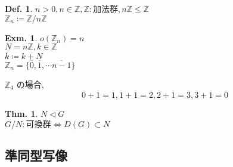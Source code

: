 \documentclass[uplatex,dvipdfmx,9pt]{beamer}
\newcommand{\nsubgroup}{\vartriangleleft} %
\newcounter{textThmCount}
\newcounter{textExmCount}
\theoremstyle{definition} %
\newtheorem{defn}{Def.}[subsection] %
\newtheorem{thmText}[textThmCount]{Thm.}
\theoremstyle{example}
\newtheorem{exmText}[textExmCount]{Exm.}
\begin{document}
      \begin{frame}
        
        \begin{defn}
          $n > 0, n \in \mathbb{Z}, \mathbb{Z} : \text{加法群}, n\mathbb{Z} \le \mathbb{Z}$ \\
          $\mathbb{Z}_n \coloneqq \mathbb{Z}/n\mathbb{Z}$
        \end{defn}
        
        \begin{exmText}
          $o(\mathbb{Z}_n) = n$ \\
          $N = n\mathbb{Z}, k \in \mathbb{Z}$ \\
          $\overline{k} \coloneqq k + N$ \\
          $\mathbb{Z}_n = \{\overline{0}, \overline{1}, \cdots \overline{n-1} \}$

          $\mathbb{Z}_4$ の場合, 
          \[
            \overline{0} + \overline{1} = \overline{1},
            \overline{1} + \overline{1} = \overline{2},
            \overline{2} + \overline{1} = \overline{3},
            \overline{3} + \overline{1} = \overline{0}
          \] 
        \end{exmText}
        

        \begin{thmText}
          $N \nsubgroup G$ \\
          $G/N : \text{可換群} \Leftrightarrow D(G) \subset N$
        \end{thmText}

      \end{frame}

    \subsection{\textsection \thesubsection 準同型写像}
    \setcounter{textExmCount}{0}
\end{document}

